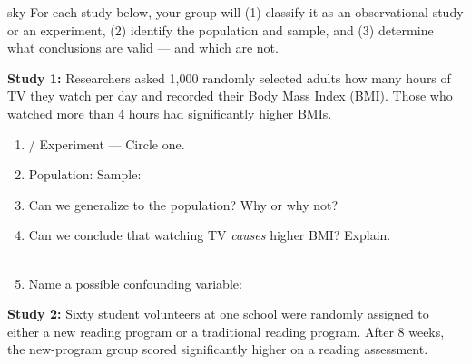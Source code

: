\documentclass[10pt]{article}
\begin{document}
\namepartnerperiod

\vspace{0.1in}

\begin{scenariobox}[Context]{sky}
\small
For each study below, your group will (1) classify it as an observational study or
an experiment, (2) identify the population and sample, and (3) determine what
conclusions are valid --- and which are not.
\end{scenariobox}

\vspace{0.1in}

\textbf{Study 1:} Researchers asked 1{,}000 randomly selected adults how many hours of
TV they watch per day and recorded their Body Mass Index (BMI). Those who watched
more than 4 hours had significantly higher BMIs.

\begin{practicebox}
\small
\begin{enumerate}[leftmargin=1.5em, itemsep=8pt]
  \item {} \quad / \quad Experiment --- Circle one.
  \item Population:  \quad Sample: 
  \item Can we generalize to the population? Why or why not?
         \quad {}
  \item Can we conclude that watching TV \emph{causes} higher BMI? Explain.\\
        \\[1pt]
  \item Name a possible confounding variable: 
\end{enumerate}
\end{practicebox}

\vspace{0.1in}

\textbf{Study 2:} Sixty student volunteers at one school were randomly assigned to
either a new reading program or a traditional reading program. After 8 weeks, the
new-program group scored significantly higher on a reading assessment.
\end{document}
